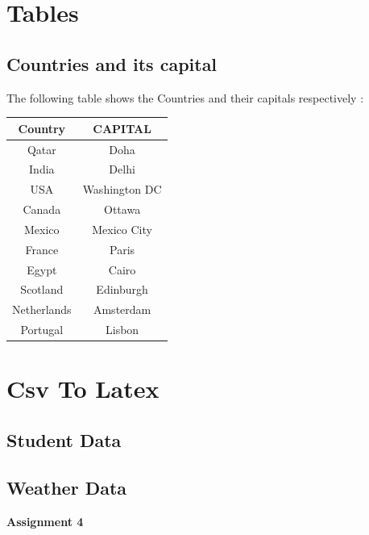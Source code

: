 \documentclass[12pt , a4paper]{article}
\begin{document}
\section{Tables}
	\subsection{Countries and its capital}
	The following table shows the Countries and their capitals respectively :\\
	\begin{center}
	
	\begin{tabular}{|c|c|}
	\hline
	\bf Country & \bf CAPITAL \\ \hline
	Qatar & Doha \\ \hline
	India & Delhi \\ \hline
	USA & Washington DC \\ \hline
	Canada & Ottawa \\ \hline
	Mexico & Mexico City \\ \hline
	France & Paris \\ \hline
	Egypt & Cairo \\ \hline
	Scotland	& Edinburgh \\ \hline
	Netherlands	 & Amsterdam \\ \hline
	Portugal & Lisbon \\ \hline
    \end{tabular}
	\end{center}
	
	\pagebreak
\section{Csv To Latex}
	\subsection{Student Data}
	\begin{table}[H]
	\centering
	\end{table}
	
	\subsection{Weather Data}
	\begin{table}[H]
	\centering
	\end{table}



\pagebreak
\begin{Huge}
\begin{center}
\bf Assignment 4
\end{center}
\end{Huge}
\end{document}
